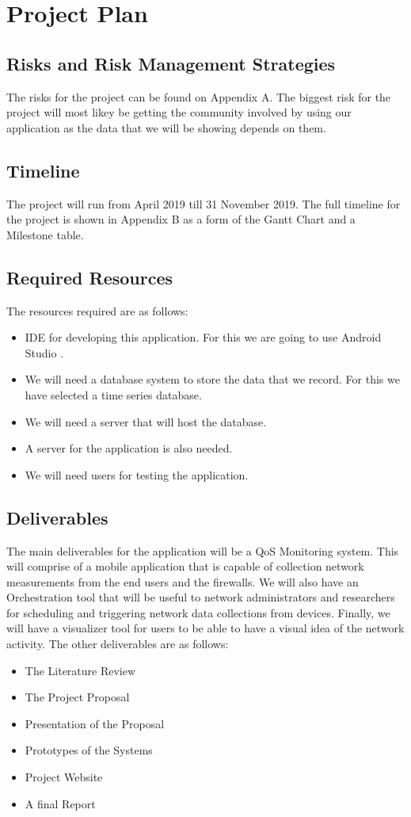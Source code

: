 \section{Project Plan}
\subsection{Risks and Risk Management Strategies}
The risks for the project can be found on Appendix A. The biggest risk for the project will most likey be getting the community involved by using our application as the data that we will be showing depends on them.
\subsection{Timeline}
The project will run from April 2019 till 31 November 2019. The full timeline for the project is shown in Appendix B as a form of the Gantt Chart and a Milestone table.
\subsection{Required Resources}
The resources required are as follows:
\begin{itemize}
	\item IDE for developing this application. For this we are going to use Android Studio \cite{android_developers}.
	\item  We will need a database system to store the data that we record. For this we have selected a time series database.
	\item We will need a server that will host the database.
	\item A server for the application is also needed.
	\item We will need users for testing the application.
\end{itemize}
\subsection{Deliverables}
The main deliverables for the application will be a QoS Monitoring system. This will comprise of a mobile application that is capable of collection network measurements from the end users and the firewalls. We will also have an Orchestration tool that will be useful to network administrators and researchers for scheduling and triggering network data collections from devices. Finally, we will have a visualizer tool for users to be able to have a visual idea of the network activity. The other deliverables are as follows:
\begin{itemize}
	\item The Literature Review
	\item The Project Proposal
	\item Presentation of the Proposal
	\item Prototypes of the Systems
	\item Project Website
	\item A final Report
\end{itemize}
